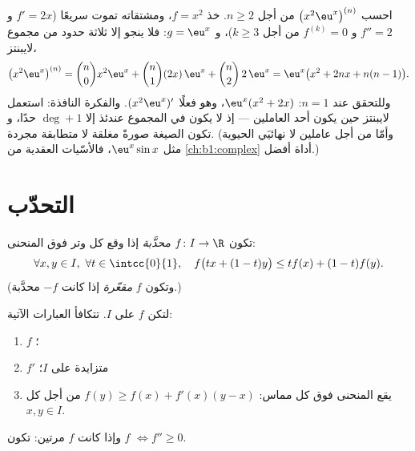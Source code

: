 \begin{example}\label{ex:b1:derivative:leibnizaction}
احسب $\bigl(x^2 \eu^x\bigr)^{(n)}$ من أجل $n \geq 2$. خذ $f =
x^2$، ومشتقاته تموت سريعًا ($f' = 2x$ و $f'' = 2$ و
$f^{(k)} = 0$ من أجل $k \geq 3$)، و $g = \eu^x$: فلا ينجو إلا ثلاثة حدود
من مجموع لايبنتز،
\[
\bigl(x^2\eu^x\bigr)^{(n)}
= \binom n0 x^2 \eu^x + \binom n1 (2x)\,\eu^x + \binom n2\,
2\,\eu^x
= \eu^x\bigl(x^2 + 2nx + n(n-1)\bigr).
\]
وللتحقق عند $n = 1$: $\eu^x(x^2 + 2x)$، وهو فعلًا
$(x^2\eu^x)'$. والفكرة النافذة: استعمل لايبنتز حين يكون أحد العاملين
 --- إذ لا يكون في المجموع عندئذ إلا $\deg + 1$ حدًا، و
تكون الصيغة صورةً مغلقة لا متطابقة مجردة. (وأمّا من أجل
عاملين لا نهائيَي الحيوية مثل $\eu^x\sin x$، فالأسّيات
العقدية من \cref{ch:b1:complex} أداة أفضل.)
\end{example}

\section{التحدّب}

\begin{definition}\label{def:b1:derivative:convex}
تكون $f \colon I \to \R$ \emph{محدَّبة} إذا وقع
كل وتر فوق المنحنى:
\[
\forall x, y \in I,\ \forall t \in \intcc{0}{1}, \quad
f\bigl(tx + (1-t)y\bigr) \leq t f(x) + (1-t) f(y).
\]
(وتكون $f$ \emph{مقعّرة} إذا كانت $-f$ محدَّبة.)
\end{definition}

\begin{theorem}\label{thm:b1:derivative:convexchar}
لتكن $f$  على $I$. تتكافأ العبارات الآتية:
\begin{enumerate}
  \item $f$ ؛
  \item $f'$ متزايدة على $I$؛
  \item يقع المنحنى فوق كل مماس: $f(y) \geq f(x) +
        f'(x)(y - x)$ من أجل كل $x, y \in I$.
\end{enumerate}
وإذا كانت $f$  مرتين: تكون $f$  $\iff f'' \geq 0$.
\end{theorem}

